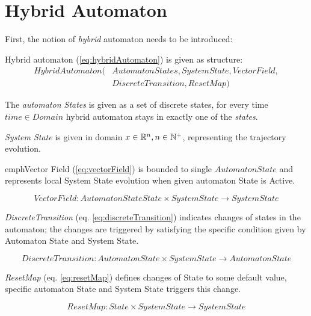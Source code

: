 \section{Hybrid Automaton}\label{s:HybridAutomaton}
    \noindent First, the notion of  \emph{hybrid} automaton  \cite{lazar2006model,borrelli2006mpc,daws1996tool} needs to be introduced:

    \begin{definition}{Hybrid automaton} (\ref{eq:hybridAutomaton}) is given as structure:
        \begin{equation}\label{eq:hybridAutomaton}
        \begin{aligned}
            HybridAutomaton(&Automaton States, SystemState, VectorField, \\
                            &DiscreteTransition,ResetMap)
        \end{aligned}
        \end{equation}
    
        \noindent The \emph{automaton States} is given as a set of discrete states, for every time $time\in Domain$ hybrid automaton stays in exactly one of the \emph{states}.
    
        \emph{System State} is given in domain $x\in\mathbb{R}^n,n\in\mathbb{N}^+$, representing the trajectory evolution.
        
        emph{Vector Field} (\ref{eq:vectorField}) is bounded to single $Automaton State$ and represents local System State evolution when given automaton State is Active.
        
        \begin{equation}\label{eq:vectorField}
            VectorField: Automaton StateState\times SystemState \to SystemState
        \end{equation}
        
        \noindent\emph{DiscreteTransition} (eq. \ref{eq:discreteTransition}) indicates changes of states in the automaton; the changes are triggered by satisfying the specific condition given by Automaton State and System State. 
        
        \begin{equation}\label{eq:discreteTransition}
            DiscreteTransition:Automaton State\times SystemState \to Automaton State
        \end{equation}
        
        \noindent \emph{ResetMap} (eq. \ref{eq:resetMap}) defines changes of State to some default value, specific automaton State and System State triggers this change.
        
        \begin{equation}\label{eq:resetMap}
            ResetMap:State\times SystemState \to SystemState
        \end{equation}
    
    \end{definition}

